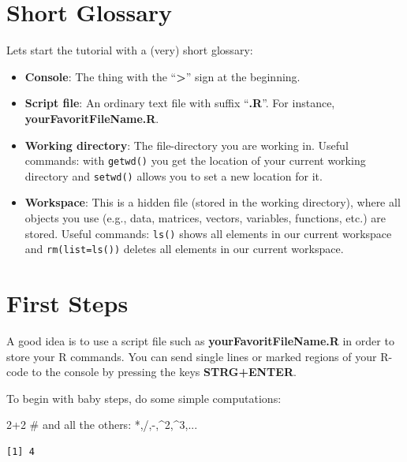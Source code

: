 \documentclass[
  letterpaper,
  DIV=11,
  numbers=noendperiod]{scrreprt}
\newenvironment{Shaded}{\begin{snugshade}}{\end{snugshade}}
\newcommand{\CommentTok}[1]{\textcolor[rgb]{0.37,0.37,0.37}{#1}}
\newcommand{\DecValTok}[1]{\textcolor[rgb]{0.68,0.00,0.00}{#1}}
\newcommand{\SpecialCharTok}[1]{\textcolor[rgb]{0.37,0.37,0.37}{#1}}
\providecommand{\tightlist}{%
  \setlength{\itemsep}{0pt}\setlength{\parskip}{0pt}}\usepackage{longtable,booktabs,array}
\theoremstyle{definition}
\theoremstyle{plain}
\theoremstyle{plain}
\theoremstyle{remark}
\begin{document}
\hypertarget{short-glossary}{%
\section{Short Glossary}\label{short-glossary}}

Lets start the tutorial with a (very) short glossary:

\begin{itemize}
\tightlist
\item
  \textbf{Console}: The thing with the ``\textbf{\textgreater{}}'' sign
  at the beginning.
\item
  \textbf{Script file}: An ordinary text file with suffix
  ``\textbf{.R}''. For instance, \textbf{yourFavoritFileName.R}.
\item
  \textbf{Working directory}: The file-directory you are working in.
  Useful commands: with \texttt{getwd()} you get the location of your
  current working directory and \texttt{setwd()} allows you to set a new
  location for it.
\item
  \textbf{Workspace}: This is a hidden file (stored in the working
  directory), where all objects you use (e.g., data, matrices, vectors,
  variables, functions, etc.) are stored. Useful commands: \texttt{ls()}
  shows all elements in our current workspace and \texttt{rm(list=ls())}
  deletes all elements in our current workspace.
\end{itemize}

\hypertarget{first-steps}{%
\section{First Steps}\label{first-steps}}

A good idea is to use a script file such as
\textbf{yourFavoritFileName.R} in order to store your R commands. You
can send single lines or marked regions of your R-code to the console by
pressing the keys \textbf{STRG+ENTER}.

To begin with baby steps, do some simple computations:

\begin{Shaded}
\begin{Highlighting}[]
\DecValTok{2}\SpecialCharTok{+}\DecValTok{2} \CommentTok{\# and all the others: *,/,{-},\^{}2,\^{}3,... }
\end{Highlighting}
\end{Shaded}

\begin{verbatim}
[1] 4
\end{verbatim}
\end{document}
